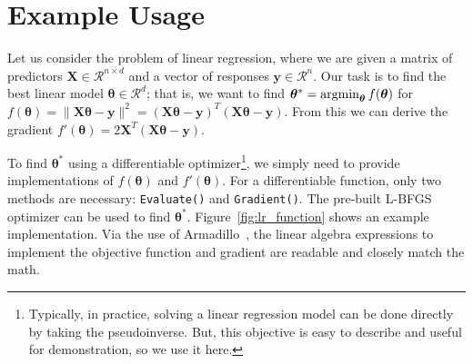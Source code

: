 \documentclass[twoside,11pt]{article}
\begin{document}

\section{Example Usage}
\label{sec:linreg_example}

Let us consider the problem of linear regression, where we are
given a matrix of predictors $\bm X \in \mathcal{R}^{n \times d}$ and a vector
of responses $\bm y \in \mathcal{R}^n$.  Our task is to find the best linear
model $\bm \theta \in \mathcal{R}^d$; that is, we want to find
$\bm \theta^* = \operatornamewithlimits{argmin}_{\bm\theta} f(\bm \theta)$ for
%
$f(\bm \theta) = \| \bm X \bm \theta - \bm y \|^2 = (\bm X \bm \theta - \bm y)^T
(\bm X \bm \theta - \bm y).$
%
From this we can derive the gradient %
%
$f'(\bm \theta) = 2 \bm X^T (\bm X \bm \theta - \bm y).$

To find $\bm \theta^*$ using a differentiable
optimizer\footnote{Typically, in practice, solving a linear regression model can
be done directly by taking the pseudoinverse.  But,
this objective is easy to describe and useful for demonstration, so we
use it here.}, we simply need to provide implementations of $f(\bm \theta)$ and
$f'(\bm \theta)$.  For a differentiable
function, only two methods are necessary: {\tt Evaluate()} and {\tt Gradient()}.
The pre-built L-BFGS optimizer can be used to find $\bm \theta^*$.
Figure~\ref{fig:lr_function} shows an example implementation.
Via the use of Armadillo~\citep{sanderson2016armadillo},
the linear algebra expressions to implement the objective function and gradient
are readable and closely match the math.%


\end{document}
